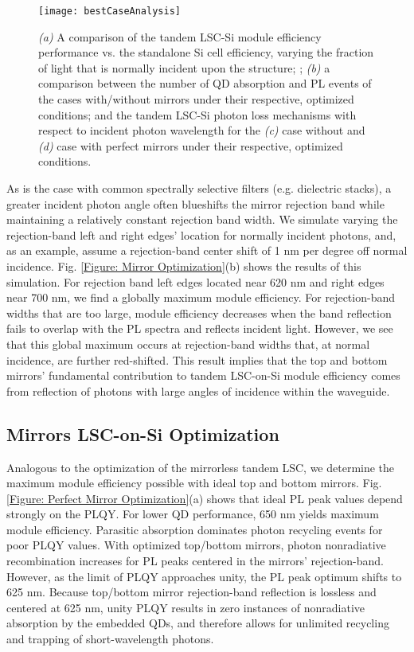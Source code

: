 \documentclass[conference]{./pvsctran}
\begin{document}
		\begin{figure*}[t]
			\centering
			\texttt{[image: bestCaseAnalysis]}
			\caption{\textit{(a)} A comparison of the tandem LSC-Si module efficiency performance vs. the standalone Si cell efficiency, varying the fraction of light that is normally incident upon the structure; ; \textit{(b)} a comparison between the number of QD absorption and PL events of the cases with/without mirrors under their respective, optimized conditions; and the tandem LSC-Si photon loss mechanisms with respect to incident photon wavelength for the \textit{(c)} case without and \textit{(d)} case with perfect mirrors under their respective, optimized conditions.}
			\label{Figure: Best Case Analysis}
		\end{figure*}
		
		As is the case with common spectrally selective filters (e.g. dielectric stacks), a greater incident photon angle often blueshifts the mirror rejection band while maintaining a relatively constant rejection band width. We simulate varying the rejection-band left and right edges’ location for normally incident photons, and, as an example, assume a rejection-band center shift of 1 nm per degree off normal incidence. Fig. \ref{Figure: Mirror Optimization}(b) shows the results of this simulation. For rejection band left edges located near 620 nm and right edges near 700 nm, we find a globally maximum module efficiency. For rejection-band widths that are too large, module efficiency decreases when the band reflection fails to overlap with the PL spectra and reflects incident light. However, we see that this global maximum occurs at rejection-band widths that, at normal incidence, are further red-shifted. This result implies that the top and bottom mirrors’ fundamental contribution to tandem LSC-on-Si module efficiency comes from reflection of photons with large angles of incidence within the waveguide.
		
		\subsection*{Mirrors LSC-on-Si Optimization}
		
		Analogous to the optimization of the mirrorless tandem LSC, we determine the maximum module efficiency possible with ideal top and bottom mirrors. Fig. \ref{Figure: Perfect Mirror Optimization}(a) shows that ideal PL peak values depend strongly on the PLQY. For lower QD performance, 650 nm yields maximum module efficiency. Parasitic absorption dominates photon recycling events for poor PLQY values. With optimized top/bottom mirrors, photon nonradiative recombination increases for PL peaks centered in the mirrors’ rejection-band. However, as the limit of PLQY approaches unity, the PL peak optimum shifts to 625 nm. Because top/bottom mirror rejection-band reflection is lossless and centered at 625 nm, unity PLQY results in zero instances of nonradiative absorption by the embedded QDs, and therefore allows for unlimited recycling and trapping of short-wavelength photons.
		
\end{document}
